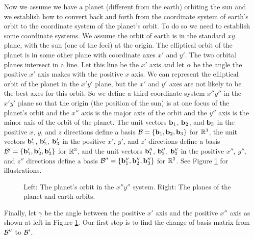 Now we assume we have a planet (different from the earth) orbiting the sun and we establish how to convert back and forth from the coordinate system of earth's orbit to the coordinate system of the planet's orbit. To do so we need to establish some coordinate systems. We assume the orbit of earth is in the standard $xy$ plane, with the sun (one of the foci) at the origin. The elliptical orbit of the planet is in some other plane with coordinate axes $x'$ and $y'$. The two orbital planes intersect in a line. Let this line be the $x'$ axis and let $\alpha$ be the angle the positive $x'$ axis makes with the positive $x$ axis. We can represent the elliptical orbit of the planet in the $x'y'$ plane, but the $x'$ and $y'$ axes are not likely to be the best axes for this orbit. So we define a third coordinate system $x''y''$ in the $x'y'$ plane so that the origin (the position of the sun) is at one focus of the planet's orbit and the $x''$ axis is the major axis of the orbit and the $y''$ axis is the minor axis of the orbit of the planet. The unit vectors $\mathbf{b}_1$, $\mathbf{b}_2$, and $\mathbf{b}_3$ in the positive $x$, $y$, and $z$ directions define a basis $\mathcal{B} = \{\mathbf{b}_1, \mathbf{b}_2, \mathbf{b}_3\}$ for $\mathbb{R}^3$, the unit vectors $\mathbf{b}'_1$, $\mathbf{b}'_2$, $\mathbf{b}'_3$ in the positive $x'$, $y'$, and $z'$ directions define a basis $\mathcal{B}' = \{\mathbf{b}'_1, \mathbf{b}'_2, \mathbf{b}'_3\}$ for $\mathbb{R}^3$, and the unit vectors $\mathbf{b}''_1$, $\mathbf{b}''_2$, $\mathbf{b}''_3$ in the positive $x''$, $y''$, and $z''$ directions define a basis $\mathcal{B}'' = \{\mathbf{b}''_1, \mathbf{b}''_2, \mathbf{b}''_3\}$ for $\mathbb{R}^3$. See Figure \ref{F:orbits} for illustrations. 
\begin{figure}[h]
\begin{center}
 \hspace{0.2in} 
\end{center}
\caption{Left: The planet's orbit in the $x''y''$ system. Right: The planes of the planet and earth orbits.}
\label{F:orbits}
\end{figure}
Finally, let $\gamma$ be the angle between the positive $x'$ axis and the positive $x''$ axis as shown at left in Figure \ref{F:orbits}. Our first step is to find the change of basis matrix from $\mathcal{B}''$ to $\mathcal{B}'$. 

